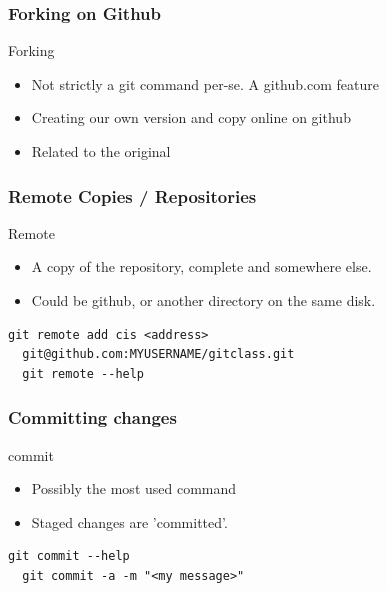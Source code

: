 \documentclass{beamer}
\begin{document}
\begin{frame}[fragile]
  \frametitle{Forking on Github}
  
  \begin{block}{Forking}
   \begin{itemize}  
      \item Not strictly a git command per-se. A github.com feature
      \item Creating our own version and copy online on github
      \item Related to the original
    \end{itemize}
  \end{block}

\end{frame}

\begin{frame}[fragile]
  \frametitle{Remote Copies / Repositories}
  
  \begin{block}{Remote}
   \begin{itemize}  
      \item A copy of the repository, complete and somewhere else.
      \item Could be github, or another directory on the same disk.
    \end{itemize}
  \end{block}

  \begin{lstlisting}[caption=Reset changes] 
  git remote add cis <address>
  git@github.com:MYUSERNAME/gitclass.git
  git remote --help
  \end{lstlisting}

\end{frame}

\begin{frame}[fragile]
  \frametitle{Committing changes}
  
  \begin{block}{commit}
    \begin{itemize}  
      \item Possibly the most used command
      \item Staged changes are 'committed'.
    \end{itemize}
  \end{block}

  \begin{lstlisting}[caption=git commit] 
  git commit --help
  git commit -a -m "<my message>"
  \end{lstlisting}

\end{frame}
\end{document}
